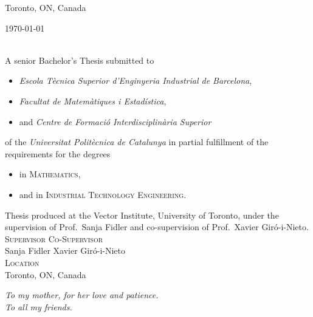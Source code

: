 \begin{titlepage}
  \vfill

  Toronto, ON, Canada \hfill \@date

  \makeatother
\end{titlepage}


\thispagestyle{plain}
\null
\vfill
\begin{sloppypar}
  \makeatletter
  \noindent \@author{} \textcopyright{} \today \\
  \texttt{\@title} \\
  \makeatother
\end{sloppypar}

\noindent A senior Bachelor's Thesis submitted to
\begin{itemize}
  \item \textsl{Escola Tècnica Superior d'Enginyeria Industrial de Barcelona},
  \item \textsl{Facultat de Matemàtiques i Estadística},
  \item and \textsl{Centre de Formació Interdisciplinària Superior}
\end{itemize}
of the \textit{Universitat Politècnica de Catalunya} in partial fulfillment of
the requirements for the degrees
\begin{itemize}
  \item in \textsc{Mathematics},
  \item and in \textsc{Industrial Technology Engineering}. \\
\end{itemize}

\noindent Thesis produced at the Vector Institute, University of Toronto, under
the supervision of Prof.\ Sanja Fidler and co-supervision of Prof.\ Xavier
Giró-i-Nieto. \\

\noindent \textsc{Supervisor} \hfill \textsc{Co-Supervisor} \\
Sanja Fidler \hfill Xavier Giró-i-Nieto \\

\noindent \textsc{Location} \\
Toronto, ON, Canada \\

\doclicenseThis


\cleardoublepage
\thispagestyle{empty}
\begin{flushright}
  \itshape
  To my mother, for her love and patience. \\
  To all my friends.
\end{flushright}


